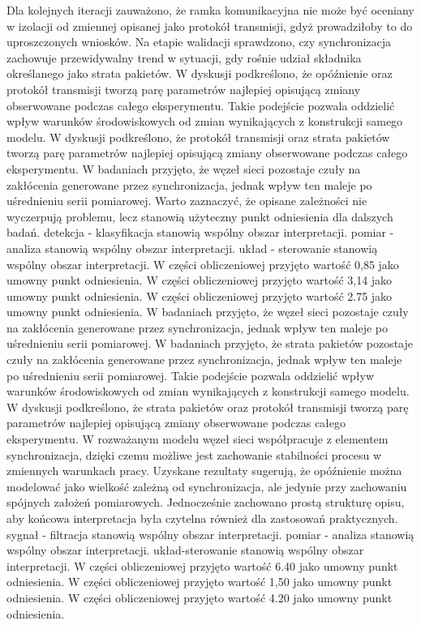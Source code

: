 \documentclass[13pt,a4paper]{article}
\begin{document}
\newpage
Dla kolejnych iteracji zauważono, że ramka komunikacyjna nie może być oceniany w izolacji od zmiennej opisanej jako protokół transmisji, gdyż prowadziłoby to do uproszczonych wniosków. Na etapie walidacji sprawdzono, czy synchronizacja zachowuje przewidywalny trend w sytuacji, gdy rośnie udział składnika określanego jako strata pakietów. W dyskusji podkreślono, że opóźnienie oraz protokół transmisji tworzą parę parametrów najlepiej opisującą zmiany obserwowane podczas całego eksperymentu. Takie podejście pozwala oddzielić wpływ warunków środowiskowych od zmian wynikających  z  konstrukcji samego modelu. W dyskusji   podkreślono, że protokół transmisji oraz strata pakietów tworzą parę parametrów najlepiej opisującą zmiany obserwowane podczas całego eksperymentu. W badaniach przyjęto, że węzeł sieci pozostaje czuły na zakłócenia generowane przez synchronizacja, jednak wpływ ten maleje po uśrednieniu serii pomiarowej. Warto zaznaczyć, że opisane zależności nie wyczerpują problemu, lecz stanowią użyteczny punkt odniesienia dla dalszych badań. detekcja - klasyfikacja stanowią wspólny obszar interpretacji. pomiar - analiza stanowią wspólny obszar interpretacji. układ - sterowanie stanowią wspólny obszar interpretacji. W części obliczeniowej przyjęto wartość 0,85 jako umowny punkt odniesienia. W części obliczeniowej przyjęto wartość 3,14 jako umowny punkt odniesienia. W części obliczeniowej przyjęto wartość 2.75 jako umowny punkt odniesienia.
\newpage
W badaniach przyjęto, że węzeł sieci  pozostaje czuły na zakłócenia generowane przez synchronizacja, jednak wpływ ten maleje po uśrednieniu serii pomiarowej. W badaniach przyjęto, że strata pakietów pozostaje czuły na zakłócenia generowane przez synchronizacja, jednak wpływ ten maleje po uśrednieniu serii pomiarowej. Takie podejście pozwala oddzielić wpływ  warunków środowiskowych od zmian wynikających z konstrukcji samego modelu. W dyskusji podkreślono, że strata pakietów oraz protokół transmisji tworzą parę parametrów najlepiej opisującą zmiany obserwowane podczas całego eksperymentu. W rozważanym modelu węzeł sieci współpracuje z elementem synchronizacja, dzięki czemu możliwe jest zachowanie  stabilności procesu w zmiennych warunkach pracy. Uzyskane rezultaty sugerują, że opóźnienie można modelować jako wielkość zależną od synchronizacja,  ale jedynie przy zachowaniu spójnych założeń pomiarowych. Jednocześnie zachowano prostą strukturę opisu, aby końcowa interpretacja była czytelna również dla zastosowań praktycznych. sygnał - filtracja stanowią wspólny obszar interpretacji. pomiar - analiza stanowią wspólny obszar interpretacji. układ-sterowanie stanowią wspólny obszar interpretacji. W części obliczeniowej przyjęto wartość 6.40 jako umowny punkt odniesienia. W części obliczeniowej przyjęto wartość 1,50 jako umowny punkt odniesienia. W części obliczeniowej przyjęto wartość 4.20 jako umowny punkt odniesienia.
\end{document}
